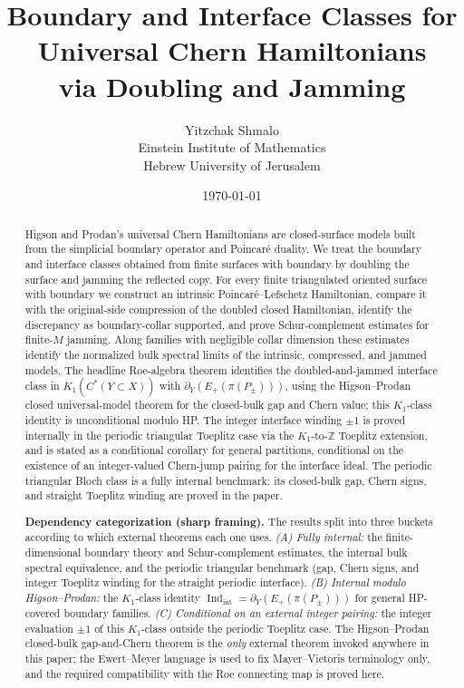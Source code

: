\documentclass[11pt]{article}
\title{Boundary and Interface Classes for Universal Chern Hamiltonians\\
via Doubling and Jamming}
\author{
Yitzchak Shmalo\\[0.6em]
Einstein Institute of Mathematics\\
Hebrew University of Jerusalem
}
\date{\today}
\numberwithin{equation}{section}
\theoremstyle{definition}
\theoremstyle{remark}
\newcommand{\Indint}{\operatorname{Ind}_{\mathrm{int}}}
\begin{document}
\maketitle

\begin{abstract}
Higson and Prodan's universal Chern Hamiltonians are closed-surface models built from the
simplicial boundary operator and Poincar\'e duality. We treat the boundary and interface classes
obtained from finite surfaces with boundary by doubling the surface and jamming the reflected copy.
For every finite triangulated oriented surface with boundary we construct an intrinsic
Poincar\'e--Lefschetz Hamiltonian, compare it with the original-side compression of the doubled
closed Hamiltonian, identify the discrepancy as boundary-collar supported, and prove
Schur-complement estimates for finite-\(M\) jamming. Along families with negligible collar
dimension these estimates identify the normalized bulk spectral limits of the intrinsic,
compressed, and jammed models. The headline Roe-algebra theorem identifies the doubled-and-jammed
interface class in \(K_1(C^*(Y\subset X))\) with
\(\partial_Y(E_+(\pi(P_\pm)))\), using the Higson--Prodan closed universal-model theorem
\cite{HigsonProdanUniversalPRL,HigsonProdanUniversalArxiv} for the closed-bulk gap and Chern
value; this \(K_1\)-class identity is unconditional modulo HP. The integer interface winding
\(\pm1\) is proved internally in the periodic triangular Toeplitz case via the
\(K_1\)-to-\(\mathbb Z\) Toeplitz extension, and is stated as a conditional corollary for
general partitions, conditional on the existence of an integer-valued Chern-jump pairing for
the interface ideal. The periodic triangular Bloch class is a fully internal benchmark: its
closed-bulk gap, Chern signs, and straight Toeplitz winding are proved in the paper.

\medskip\noindent
\textbf{Dependency categorization (sharp framing).} The results split into three buckets
according to which external theorems each one uses. \emph{(A) Fully internal:} the
finite-dimensional boundary theory and Schur-complement estimates, the internal bulk spectral
equivalence, and the periodic triangular benchmark (gap, Chern signs, and integer Toeplitz
winding for the straight periodic interface). \emph{(B) Internal modulo Higson--Prodan:} the
\(K_1\)-class identity \(\Indint=\partial_Y(E_+(\pi(P_\pm)))\) for general HP-covered boundary
families. \emph{(C) Conditional on an external integer pairing:} the integer evaluation
\(\pm 1\) of this \(K_1\)-class outside the periodic Toeplitz case. The Higson--Prodan
closed-bulk gap-and-Chern theorem is the \emph{only} external theorem invoked anywhere in this
paper; the Ewert--Meyer language is used to fix Mayer--Vietoris terminology only, and the
required compatibility with the Roe connecting map is proved here.


\end{abstract}
\end{document}
